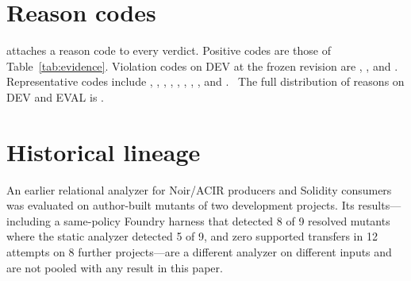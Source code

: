 \section{Reason codes}\label{app:reasons}
{\raggedright

\tool{} attaches a reason code to every verdict. Positive codes are those of
Table~\ref{tab:evidence}. Violation codes on DEV at the frozen revision are
, ,
 and
. Representative \UNK{} codes include
, ,
,
,
,
,
,
,
 and
.%
\
The full distribution of \UNK{} reasons on DEV and EVAL is
.\par}

\section{Historical lineage}\label{app:lineage}

An earlier relational analyzer for Noir/ACIR producers and Solidity consumers
was evaluated on author-built mutants of two development projects. Its
results---including a same-policy Foundry harness that detected 8 of 9
resolved mutants where the static analyzer detected 5 of 9, and zero supported
transfers in 12 attempts on 8 further projects---are a different analyzer on different
inputs and are not pooled with any result in this paper.%
